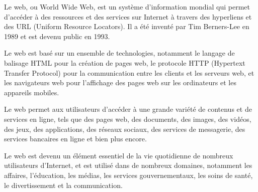 Le web, ou World Wide Web, est un système d'information mondial qui permet d'accéder à des ressources et des services sur Internet à travers des hyperliens et des URL (Uniform Resource Locators). Il a été inventé par Tim Berners-Lee en 1989 et est devenu public en 1993.

Le web est basé sur un ensemble de technologies, notamment le langage de balisage HTML pour la création de pages web, le protocole HTTP (Hypertext Transfer Protocol) pour la communication entre les clients et les serveurs web, et les navigateurs web pour l'affichage des pages web sur les ordinateurs et les appareils mobiles.

Le web permet aux utilisateurs d'accéder à une grande variété de contenus et de services en ligne, tels que des pages web, des documents, des images, des vidéos, des jeux, des applications, des réseaux sociaux, des services de messagerie, des services bancaires en ligne et bien plus encore.

Le web est devenu un élément essentiel de la vie quotidienne de nombreux utilisateurs d'Internet, et est utilisé dans de nombreux domaines, notamment les affaires, l'éducation, les médias, les services gouvernementaux, les soins de santé, le divertissement et la communication.